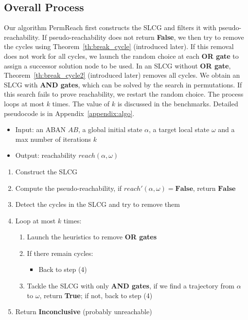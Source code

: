 \documentclass{article}
\theoremstyle{definition}
\begin{document}
\subsection{Overall Process}\label{sectOverall}
Our algorithm PermReach first constructs the SLCG and filters it with pseudo-reachability. 
If pseudo-reachability does not return \textbf{False}, we then try to remove the cycles using Theorem~\ref{th:break_cycle} (introduced later).
If this removal does not work for all cycles, we launch the random choice at each \textbf{OR gate} to assign a successor solution node to be used.
In an SLCG without \textbf{OR gate}, Theorem~\ref{th:break_cycle2} (introduced later) removes all cycles.
We obtain an SLCG with \textbf{AND gates}, which can be solved by the search in permutations.
If this search fails to prove reachability, we restart the random choice.
The process loops at most $k$ times.
The value of $k$ is discussed in the benchmarks.
Detailed pseudocode is in Appendix~\ref{appendix:algo}.
\begin{itemize}
    \item Input: an ABAN $AB$, a global initial state $\alpha$, a target local state $\omega$ and a max number of iterations $k$
    \item Output: reachability $reach(\alpha, \omega)$
\end{itemize}
\begin{enumerate}
\item Construct the SLCG
\item Compute the pseudo-reachability, if $reach'(\alpha,\omega)=\mathbf{False}$, return $\mathbf{False}$
\item Detect the cycles in the SLCG and try to remove them 
\item Loop at most $k$ times:
\begin{enumerate}
    \item Launch the heuristics to remove \textbf{OR gates} 
    \item If there remain cycles:
    \begin{itemize}
        \item Back to step (4)
    \end{itemize}
    \item Tackle the SLCG with only \textbf{AND gates}, if we find a trajectory from $\alpha$ to $\omega$, return \textbf{True}; if not, back to step (4)
\end{enumerate}
\item Return \textbf{Inconclusive} (probably unreachable)
\end{enumerate}
\end{document}

